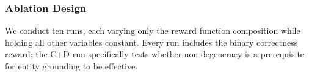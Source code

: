 \subsubsection{Ablation Design}
\nestindent

We conduct ten runs, each varying only the reward function composition while holding all other variables constant.
Every run includes the binary correctness reward; the C+D run specifically tests whether non-degeneracy is a prerequisite for entity grounding to be effective.


\nestunindent

